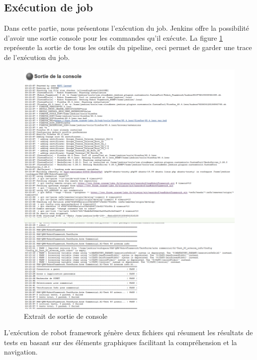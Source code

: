 \subsection{Exécution de job}
Dans cette partie, nous présentons l’exécution du job. Jenkins offre la possibilité d’avoir une sortie console pour les commandes qu’il exécute.\newpage
La figure \ref{fig:exemple-console} représente la sortie de tous les outils du pipeline, ceci permet de garder une trace de l’exécution du job.
\begin{figure}[H]
	\centering
	\includegraphics[width=1.1\linewidth]{"img/jenkins/exemple console"}
	\caption[Extrait de sortie de console]{Extrait de sortie de console}
	\label{fig:exemple-console}
\end{figure}
L’exécution de robot framework génère deux fichiers qui résument les résultats de tests en basant sur des éléments graphiques facilitant la compréhension et la navigation.
